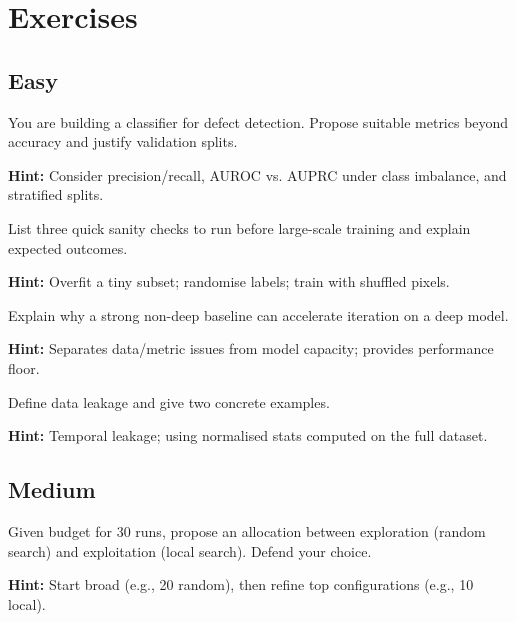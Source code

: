 
\section*{Exercises}

\subsection*{Easy}

\begin{problem}
You are building a classifier for defect detection. Propose suitable metrics beyond accuracy and justify validation splits.

\textbf{Hint:} Consider precision/recall, AUROC vs. AUPRC under class imbalance, and stratified splits.
\end{problem}

\begin{problem}
List three quick sanity checks to run before large-scale training and explain expected outcomes.

\textbf{Hint:} Overfit a tiny subset; randomise labels; train with shuffled pixels.
\end{problem}

\begin{problem}
Explain why a strong non-deep baseline can accelerate iteration on a deep model.

\textbf{Hint:} Separates data/metric issues from model capacity; provides performance floor.
\end{problem}

\begin{problem}
Define data leakage and give two concrete examples.

\textbf{Hint:} Temporal leakage; using normalised stats computed on the full dataset.
\end{problem}

\subsection*{Medium}

\begin{problem}
Given budget for 30 runs, propose an allocation between exploration (random search) and exploitation (local search). Defend your choice.

\textbf{Hint:} Start broad (e.g., 20 random), then refine top configurations (e.g., 10 local).
\end{problem}

